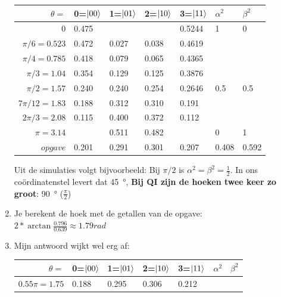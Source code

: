 \documentclass[../../main.tex]{subfiles}
\begin{document}
\begin{enumerate}
\begin{flushleft}
\small{
\begin{tabular}{|r|l|l|l|l||l|l|}
\hline
$\theta=$     & 0=$\ket{00}$  & 1=$\ket{01}$   & 2=$\ket{10}$   & 3=$\ket{11}$ &$\alpha^2$&$\beta^2$ \\ \hline
$0$           & 0.475 &        &        & 0.5244 & 1 &0 \\
$\pi/6=0.523$ & 0.472 & 0.027  & 0.038  & 0.4619 &   & \\
$\pi/4=0.785$ & 0.418 & 0.079  & 0.065  & 0.4365 & & \\
$\pi/3=1.04$  & 0.354 & 0.129  & 0.125  & 0.3876 & & \\
$\pi/2=1.57$  & 0.240 & 0.240  & 0.254  & 0.2646 & 0.5&0.5 \\
$7\pi/12=1.83$& 0.188 & 0.312  & 0.310  & 0.191  & & \\
$2\pi/3=2.08$ & 0.115 & 0.400  & 0.372  & 0.112  & & \\
$\pi=3.14$    &       & 0.511  & 0.482  &        &0 &1 \\
$opgave$      & 0.201 & 0.291  & 0.301  & 0.207  &0.408 & 0.592 \\
\hline
\end{tabular}
}
\end{flushleft}

Uit de simulaties volgt bijvoorbeeld: Bij $\pi/2$ is $\alpha^2=\beta^2=\tfrac{1}{2}$. 
In ons co\"ordinatenstel levert dat \SI{45}{\degree}, \textbf{Bij QI zijn de hoeken twee keer zo groot}: \SI{90}{\degree} ($\tfrac{\pi}{2}$)

\item Je berekent de hoek met de getallen van de opgave:\\
 $2*\arctan\tfrac{0.796}{0.639}\approx 1.79 rad $


\item Mijn antwoord wijkt wel erg af:
\begin{flushleft}
\small{
\begin{tabular}{|r|l|l|l|l||l|l|}
\hline
$\theta=$     & 0=$\ket{00}$  & 1=$\ket{01}$   & 2=$\ket{10}$   & 3=$\ket{11}$ &$\alpha^2$&$\beta^2$ \\ \hline
$0.55\pi=1.75$ & 0.188 & 0.295  & 0.306  & 0.212 &   & \\
\hline
\end{tabular}
}
\end{flushleft}

\end{enumerate}
\end{document}
